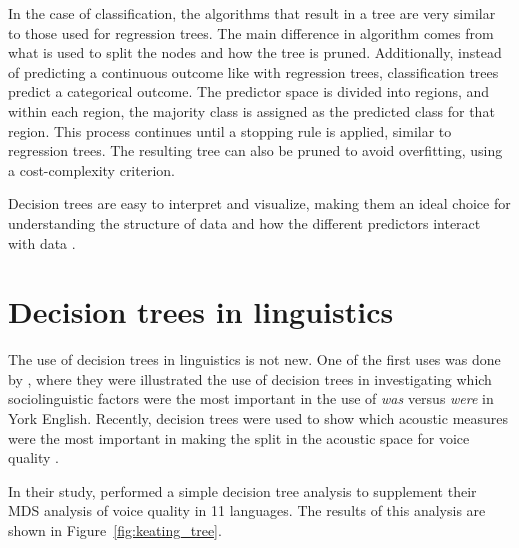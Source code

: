 In the case of classification, the algorithms that result in a tree are very similar to those used for regression trees. The main difference in algorithm comes from what is used to split the nodes and how the tree is pruned. Additionally, instead of predicting a continuous outcome like with regression trees, classification trees predict a categorical outcome. The predictor space is divided into regions, and within each region, the majority class is assigned as the predicted class for that region. This process continues until a stopping rule is applied, similar to regression trees. The resulting tree can also be pruned to avoid overfitting, using a cost-complexity criterion.

Decision trees are easy to interpret and visualize, making them an ideal choice for understanding the structure of data and how the different predictors interact with data \citep{hastieElementsStatisticalLearning2009,jamesIntroductionStatisticalLearning2021}.

\section{Decision trees in linguistics}\label{}

The use of decision trees in linguistics is not new. One of the first uses was done by \citet{tagliamonteModelsForestsTrees2012}, where they were illustrated the use of decision trees in investigating which sociolinguistic factors were the most important in the use of \textit{was} versus \textit{were} in York English. Recently, decision trees were used to show which acoustic measures were the most important in making the split in the acoustic space for voice quality \citep{keatingCrosslanguageAcousticSpace2023}. 

In their study, \citet{keatingCrosslanguageAcousticSpace2023} performed a simple decision tree analysis to supplement their MDS analysis of voice quality in 11 languages. The results of this analysis are shown in Figure~\ref{fig:keating_tree}. 

